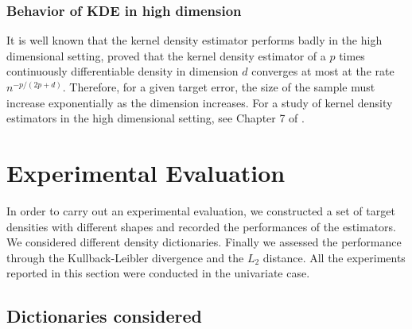 \subsubsection{Behavior of KDE in high dimension}
It is well known that the kernel density estimator performs badly in the high dimensional setting, \citep{stone1980} proved that the kernel density estimator of a $p$ times continuously differentiable density in dimension $d$ converges at most at the rate $n^{-p/(2p+d)}$. Therefore, for a given target error, the size of the sample must increase exponentially as the dimension increases. For a study of kernel density estimators in the high dimensional setting, see Chapter 7 of \citep{scott_multivariate_2015}. 

\section{Experimental Evaluation}

In order to carry out an experimental evaluation, we constructed a set of target densities with different shapes and recorded the performances of the estimators. We considered different density dictionaries. Finally we assessed the performance through the Kullback-Leibler divergence and the $L_2$ distance. All the experiments reported in this section were conducted in the univariate case.

\subsection{Dictionaries considered}

